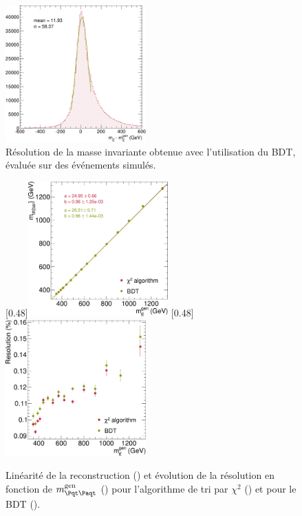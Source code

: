 \begin{figure}[tbp]
  \centering
  \includegraphics[width=0.48\textwidth]{chapitre6/figs/mtt_resolution_bdt.pdf}
  \caption{Résolution de la masse invariante \mtt obtenue avec l'utilisation du BDT, évaluée sur des événements \ttbar simulés.}
  \label{fig:mtt_reso_bdt}
\end{figure}


\begin{figure}[tbp] \centering
    \subcaptionbox{\label{fig:mtt_response_chi2_vs_bdt}}[0.48\textwidth]{\includegraphics[width=0.48\textwidth]{chapitre6/figs/mtt_response_vs_gen_comparison_chi2_bdt.pdf}}\hfill
    \subcaptionbox{\label{fig:mtt_reso_vs_mtt_gen_chi2_vs_bdt}}[0.48\textwidth]{\includegraphics[width=0.48\textwidth]{chapitre6/figs/mtt_resolution_vs_gen_comparison_chi2_bdt.pdf}}
    \caption{Linéarité de la reconstruction () et évolution de la résolution en fonction de $\mtt^\text{gen}$ () pour l'algorithme de tri par $\chi^2$ (\rouge) et pour le BDT (\vertc).}
    \label{fig:mtt_reso_chi2_vs_bdt}
\end{figure}

